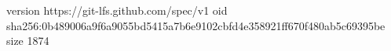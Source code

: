 version https://git-lfs.github.com/spec/v1
oid sha256:0b489006a9f6a9055bd5415a7b6e9102cbfd4e358921ff670f480ab5c69395be
size 1874

